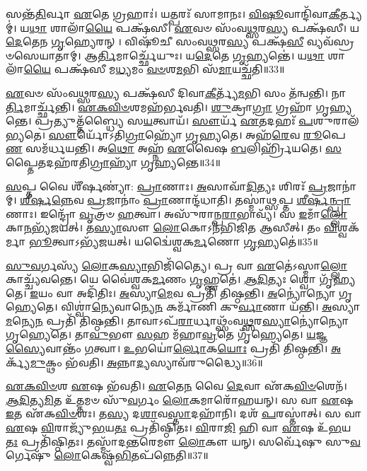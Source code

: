𑌸𑌨𑍍𑌤᳴\-\ul{𑌤𑌿}\-𑌰𑍍𑌵𑌾 \ul{𑌏}\-𑌤𑍇 𑌗𑍍𑌰𑌹𑌾𑌃॑।
𑌯𑌤𑍍𑌪𑌰𑌃᳴ 𑌸𑌾𑌮𑌾𑌨𑌃।
\-\ul{𑌵𑌿}\-\-\ul{𑌷𑍂}\-𑌵𑌾𑌨𑍍𑌦𑌿᳴𑌵𑌾\-\-\ul{𑌕𑍀}\-𑌰𑍍𑌤𑍍𑌯𑌮𑍍॑।
𑌯\-\ul{𑌥𑌾} 𑌶𑌾𑌲𑌾᳴\-\ul{𑌯𑍈} 𑌪𑌕𑍍𑌷᳴𑌸𑍀।
\-\ul{𑌏}\-𑌵𑍞 𑌸𑌂᳴𑌵\-\ul{𑌥𑍍𑌸}\-𑌰\-\ul{𑌸𑍍𑌯} 𑌪𑌕𑍍𑌷᳴𑌸𑍀।
𑌯\-\ul{𑌦𑍇}\-𑌤𑍇𑌨 \ul{𑌗𑍃}\-𑌹𑍍𑌯𑍇𑌰𑌨𑍍।
𑌵𑌿𑌷𑍂᳴𑌚𑍀 𑌸𑌂𑌵\-\ul{𑌥𑍍𑌸}\-𑌰\-\ul{𑌸𑍍𑌯} 𑌪𑌕𑍍𑌷᳴\-\ul{𑌸𑍀} 𑌵𑍍𑌯𑌵᳴𑌸𑍍𑌰𑍞𑌸𑍇𑌯𑌾𑌤𑌾𑌮𑍍।
𑌆\-\ul{𑌰𑍍𑌤𑌿}\-𑌮𑌾𑌰𑍍𑌚𑍍𑌛𑍇᳴𑌯𑍁𑌃।
𑌯\-\ul{𑌦𑍇}\-𑌤𑍇 \ul{𑌗𑍃}\-𑌹𑍍𑌯𑌨𑍍𑌤𑍇॑।
𑌯\-\ul{𑌥𑌾} 𑌶𑌾𑌲𑌾᳴\-\ul{𑌯𑍈} 𑌪𑌕𑍍𑌷᳴𑌸𑍀 𑌮\-\ul{𑌧𑍍𑌯}\-𑌮𑌂 \ul{𑌵}\-\-\ul{𑍞}\-𑌶\-\ul{𑌮}\-𑌭𑌿 𑌸᳴\-\ul{𑌮𑌾}\-𑌯𑌚𑍍𑌛᳴𑌤𑌿॥33॥

\-\ul{𑌏}\-𑌵𑍞 𑌸𑌂᳴𑌵\-\ul{𑌥𑍍𑌸}\-𑌰\-\ul{𑌸𑍍𑌯} 𑌪𑌕𑍍𑌷᳴𑌸𑍀 𑌦𑌿𑌵𑌾\-\ul{𑌕𑍀}\-𑌰𑍍𑌤𑍍𑌯᳴\-\ul{𑌮}\-𑌭𑌿 𑌸𑌂 𑌤᳴𑌨𑍍𑌵𑌨𑍍𑌤𑌿।
𑌨𑌾\-\ul{𑌰𑍍𑌤𑌿}\-𑌮𑌾𑌰𑍍𑌚𑍍𑌛᳴𑌨𑍍𑌤𑌿।
\-\ul{𑌏}\-\-\ul{𑌕}\-\-\ul{𑌵𑌿}\-\-\ul{𑍞}\-𑌶𑌮𑌹᳴𑌰𑍍𑌭𑌵𑌤𑌿।
\-\ul{𑌶𑍁}\-𑌕𑍍𑌰𑌾\-\ul{𑌗𑍍𑌰𑌾} 𑌗𑍍𑌰𑌹𑌾᳴ 𑌗𑍃𑌹𑍍𑌯𑌨𑍍𑌤𑍇।
𑌪𑍍𑌰𑌤𑍍𑌯𑍁𑌤𑍍𑌤᳴𑌬𑍍𑌧𑍍𑌯𑍈 𑌸\-\ul{𑌯}\-𑌤𑍍𑌵𑌾𑌯᳴।
\-\ul{𑌸𑍗}\-𑌰𑍍𑌯᳴ \ul{𑌏}\-𑌤𑌦𑌹𑌃᳴ \ul{𑌪}\-𑌶𑍁𑌰𑌾𑌲᳴𑌭𑍍𑌯𑌤𑍇।
\-\ul{𑌸𑍗}\-𑌰𑍍𑌯𑍋᳴\-𑌽𑌤𑌿\-\ul{𑌗𑍍𑌰𑌾}\-𑌹𑍍𑌯𑍋᳴ 𑌗𑍃𑌹𑍍𑌯𑌤𑍇।
𑌅𑌹᳴\-\ul{𑌰𑍇}\-𑌵 \ul{𑌰𑍂}\-𑌪𑍇\-\ul{𑌣} 𑌸𑌮᳴𑌰𑍍𑌧𑌯𑌨𑍍𑌤𑌿।
𑌅\-\ul{𑌥𑍋} 𑌅𑌹𑍍𑌨᳴ \ul{𑌏}\-𑌵𑍈𑌷 \ul{𑌬}\-𑌲𑌿𑌰𑍍\mbox{}𑌹𑍍𑌰𑌿᳴𑌯𑌤𑍇।
\-\ul{𑌸}\-𑌪𑍍𑌤𑍈𑌤𑌦𑌹᳴𑌰𑌤𑌿\-\ul{𑌗𑍍𑌰𑌾}\-𑌹𑍍𑌯𑌾᳴ 𑌗𑍃𑌹𑍍𑌯𑌨𑍍𑌤𑍇॥34॥

\-\ul{𑌸}\-𑌪𑍍𑌤 𑌵𑍈 𑌶𑍀᳴𑌰𑍍\mbox{}\-\ul{𑌷}\-𑌣𑍍𑌯𑌾॑: \ul{𑌪𑍍𑌰𑌾}\-𑌣𑌾𑌃।
\-\ul{𑌅}\-𑌸𑌾𑌵𑌾᳴\-\ul{𑌦𑌿}\-𑌤𑍍𑌯𑌃 𑌶𑌿𑌰𑌃᳴ \ul{𑌪𑍍𑌰}\-𑌜𑌾𑌨𑌾॑𑌮𑍍।
\-\ul{𑌶𑍀}\-\-\ul{𑌰𑍍}\-𑌷\-\ul{𑌨𑍍𑌨𑍇}\-𑌵 \ul{𑌪𑍍𑌰}\-𑌜𑌾𑌨𑌾𑌂॑ \ul{𑌪𑍍𑌰𑌾}\-𑌣𑌾𑌨𑍍𑌦᳴𑌧𑌾𑌤𑌿।
𑌤𑌸𑍍𑌮𑌾॑\-\ul{𑌥𑍍𑌸}\-𑌪𑍍𑌤 \ul{𑌶𑍀}\-\-\ul{𑌰𑍍}\-𑌷\-\ul{𑌨𑍍𑌪𑍍𑌰𑌾}\-𑌣𑌾𑌃।
𑌇𑌨𑍍𑌦𑍍𑌰𑍋᳴ \ul{𑌵𑍃}\-𑌤𑍍𑌰𑍞 \ul{𑌹}\-𑌤𑍍𑌵𑌾।
𑌅𑌸𑍁᳴𑌰𑌾𑌨𑍍𑌪\-\ul{𑌰𑌾}\-𑌭𑌾𑌵𑍍𑌯᳴।
𑌸 \ul{𑌇}\-𑌮𑌾𑌁\-\ul{𑌲𑍍𑌲𑍋}\-𑌕𑌾\-\ul{𑌨}\-𑌭𑍍𑌯᳴𑌜𑌯𑌤𑍍।
𑌤\-\ul{𑌸𑍍𑌯𑌾}\-𑌸𑍗 \ul{𑌲𑍋}\-𑌕𑍋\-𑌽𑌨᳴𑌭𑌿𑌜𑌿𑌤 𑌆𑌸𑍀𑌤𑍍।
𑌤𑌂 \ul{𑌵𑌿}\-𑌶𑍍𑌵𑌕᳴𑌰𑍍𑌮𑌾 \ul{𑌭𑍂}\-𑌤𑍍𑌵𑌾\-𑌽𑌭𑍍𑌯᳴𑌜𑌯𑌤𑍍।
𑌯𑌦𑍍𑌵𑍈॑𑌶𑍍𑌵𑌕\-\ul{𑌰𑍍𑌮}\-𑌣𑍋 \ul{𑌗𑍃}\-𑌹𑍍𑌯𑌤𑍇॑॥35॥

\-\ul{𑌸𑍁}\-\-\ul{𑌵}\-𑌰𑍍𑌗𑌸𑍍𑌯᳴ \ul{𑌲𑍋}\-𑌕\-\ul{𑌸𑍍𑌯𑌾}\-𑌭𑌿𑌜𑌿᳴𑌤𑍍𑌯𑍈।
𑌪𑍍𑌰 𑌵𑌾 \ul{𑌏}\-𑌤𑍇॑\-𑌽𑌸𑍍𑌮𑌾\-\ul{𑌲𑍍𑌲𑍋}\-𑌕𑌾𑌚𑍍𑌚𑍍𑌯᳴𑌵𑌨𑍍𑌤𑍇।
𑌯𑍇 𑌵𑍈॑𑌶𑍍𑌵𑌕\-\ul{𑌰𑍍𑌮}\-𑌣𑌂 \ul{𑌗𑍃}\-𑌹𑍍𑌣𑌤𑍇॑।
\-\ul{𑌆}\-\-\ul{𑌦𑌿}\-𑌤𑍍𑌯𑌃 𑌶𑍍𑌵𑍋 𑌗𑍃᳴𑌹𑍍𑌯𑌤𑍇।
\-\ul{𑌇}\-𑌯𑌂 𑌵𑌾 𑌅𑌦𑌿᳴𑌤𑌿𑌃।
\-\ul{𑌅}\-𑌸𑍍𑌯𑌾\-\ul{𑌮𑍇}\-𑌵 𑌪𑍍𑌰𑌤𑌿᳴ 𑌤𑌿𑌷𑍍𑌠𑌨𑍍𑌤𑌿।
\-\ul{𑌅}\-𑌨𑍍𑌯𑍋॑𑌨𑍍𑌯𑍋 𑌗𑍃𑌹𑍍𑌯𑍇𑌤𑍇।
𑌵𑌿𑌶𑍍𑌵𑌾॑\-\ul{𑌨𑍍𑌯𑍇}\-𑌵𑌾𑌨𑍍𑌯𑍇\-\ul{𑌨} 𑌕𑌰𑍍𑌮𑌾᳴𑌣𑌿 𑌕𑍁\-\ul{𑌰𑍍𑌵𑌾}\-𑌣𑌾 𑌯᳴𑌨𑍍𑌤𑌿।
\-\ul{𑌅}\-𑌸𑍍𑌯𑌾\-\ul{𑌮}\-𑌨𑍍𑌯𑍇\-\ul{𑌨} 𑌪𑍍𑌰𑌤𑌿᳴ 𑌤𑌿𑌷𑍍𑌠𑌨𑍍𑌤𑌿।
𑌤𑌾𑌵𑌾𑌽𑌪᳴\-\ul{𑌰𑌾}\-𑌰𑍍𑌧𑌾𑌥𑍍𑌸𑌂᳴𑌵\-\ul{𑌥𑍍𑌸}\-𑌰\-\ul{𑌸𑍍𑌯𑌾}\-𑌨𑍍𑌯𑍋॑𑌨𑍍𑌯𑍋 𑌗𑍃𑌹𑍍𑌯𑍇𑌤𑍇।
𑌤𑌾\-\ul{𑌵𑍁}\-𑌭𑍗 \ul{𑌸}\-𑌹 𑌮᳴𑌹𑌾\-\ul{𑌵𑍍𑌰}\-𑌤𑍇 𑌗𑍃᳴𑌹𑍍𑌯𑍇𑌤𑍇।
\-\ul{𑌯}\-𑌜𑍍𑌞\-\ul{𑌸𑍍𑌯𑍈}\-𑌵𑌾𑌨𑍍𑌤𑌂᳴ \ul{𑌗}\-𑌤𑍍𑌵𑌾।
\-\ul{𑌉}\-𑌭𑌯𑍋॑\-\ul{𑌰𑍍𑌲𑍋}\-𑌕\-\ul{𑌯𑍋𑌃} 𑌪𑍍𑌰𑌤𑌿᳴ 𑌤𑌿𑌷𑍍𑌠𑌨𑍍𑌤𑌿।
\-\ul{𑌅}\-𑌰𑍍𑌕𑍍𑌯᳴\-\ul{𑌮𑍁}\-𑌕𑍍𑌥𑌂 𑌭᳴𑌵𑌤𑌿।
\-\ul{𑌅}\-𑌨𑍍𑌨𑌾\-\ul{𑌦𑍍𑌯}\-𑌸𑍍𑌯𑌾𑌵᳴𑌰𑍁𑌦𑍍𑌧𑍍𑌯𑍈॥36॥\anuvakamend[\-\ul{𑌸}\-\-\ul{𑌮𑌾}\-𑌯𑌚𑍍𑌛᳴𑌤𑍍𑌯𑌤𑌿\-\ul{𑌗𑍍𑌰𑌾}\-𑌹𑍍𑌯𑌾᳴ 𑌗𑍃𑌹𑍍𑌯𑌨𑍍𑌤𑍇 \ul{𑌗𑍃}\-𑌹𑍍𑌯𑌤𑍇᳴ 𑌸𑌂𑌵\-\ul{𑌥𑍍𑌸}\-𑌰\-\ul{𑌸𑍍𑌯𑌾}\-𑌨𑍍𑌯𑍋॑𑌨𑍍𑌯𑍋 𑌗𑍃𑌹𑍍𑌯𑍇\-\ul{𑌤𑍇} 𑌪𑌞𑍍𑌚᳴ 𑌚]

\-\ul{𑌏}\-\-\ul{𑌕}\-\-\ul{𑌵𑌿}\-\-\ul{𑍞}\-𑌶 \ul{𑌏}\-𑌷 𑌭᳴𑌵𑌤𑌿।
\-\ul{𑌏}\-𑌤𑍇\-\ul{𑌨} 𑌵𑍈 \ul{𑌦𑍇}\-𑌵𑌾 𑌏᳴𑌕\-\ul{𑌵𑌿}\-\-\ul{𑍞}\-𑌶𑍇𑌨᳴।
\-\ul{𑌆}\-\-\ul{𑌦𑌿}\-𑌤𑍍𑌯\-\ul{𑌮𑌿}\-𑌤 𑌉᳴\-\ul{𑌤𑍍𑌤}\-𑌮𑍞 𑌸𑍁᳴\-\ul{𑌵}\-𑌰𑍍𑌗𑌂 \ul{𑌲𑍋}\-𑌕𑌮𑌾𑌰𑍋᳴𑌹𑌯𑌨𑍍।
𑌸 𑌵𑌾 \ul{𑌏}\-𑌷 \ul{𑌇}\-𑌤 𑌏᳴𑌕\-\ul{𑌵𑌿}\-\-\ul{𑍞}\-𑌶𑌃।
𑌤\-\ul{𑌸𑍍𑌯} 𑌦\-\ul{𑌶𑌾}\-𑌵\-\ul{𑌸𑍍𑌤𑌾}\-𑌦𑌹𑌾᳴𑌨𑌿।
𑌦𑌶᳴ \ul{𑌪}\-𑌰𑌸𑍍𑌤𑌾॑𑌤𑍍।
𑌸 𑌵𑌾 \ul{𑌏}\-𑌷 \ul{𑌵𑌿}\-𑌰𑌾𑌜𑍍𑌯𑍁᳴\-\ul{𑌭}\-𑌯\-\ul{𑌤𑌃} 𑌪𑍍𑌰𑌤𑌿᳴\-𑌷𑍍𑌠𑌿𑌤𑌃।
\-\ul{𑌵𑌿}\-𑌰𑌾\-\ul{𑌜𑌿} 𑌹𑌿 𑌵𑌾 \ul{𑌏}\-𑌷 𑌉᳴\-\ul{𑌭}\-𑌯\-\ul{𑌤𑌃} 𑌪𑍍𑌰𑌤𑌿᳴\-𑌷𑍍𑌠𑌿𑌤𑌃।
𑌤𑌸𑍍𑌮𑌾᳴𑌦\-\ul{𑌨𑍍𑌤}\-𑌰𑍇𑌮𑍗 \ul{𑌲𑍋}\-𑌕𑍗 𑌯𑌨𑍍।
𑌸𑌰𑍍𑌵𑍇᳴𑌷𑍁 𑌸𑍁\-\ul{𑌵}\-𑌰𑍍𑌗𑍇𑌷𑍁᳴ \ul{𑌲𑍋}\-𑌕𑍇𑌷𑍍𑌵᳴\-\ul{𑌭𑌿}\-𑌤𑌪᳴𑌨𑍍𑌨𑍇𑌤𑌿॥37॥

